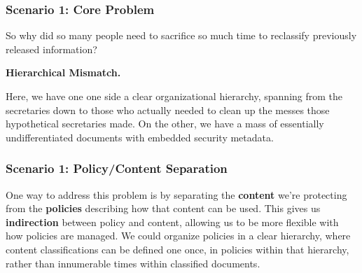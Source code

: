 \documentclass[t,handout, 10pt]{beamer}
\begin{document}
\begin{frame}
\frametitle{Scenario 1: Core Problem}
So why did so many people need to sacrifice so much time to reclassify previously released information?
\newline
\pause
\begin{center}
\textbf{Hierarchical Mismatch.}
\end{center}
\pause
Here, we have one one side a clear organizational hierarchy, spanning from the secretaries down to those who actually needed to clean up the messes those hypothetical secretaries made.  On the other, we have a mass of essentially undifferentiated documents with embedded security metadata.
\end{frame}

\begin{frame}
\frametitle{Scenario 1: Policy/Content Separation}
One way to address this problem is by separating the \textbf{content} we're protecting from the \textbf{policies} describing how that content can be used.
\pause
\newline
\newline
This gives us \textbf{indirection} between policy and content, allowing us to be more flexible with how policies are managed.
\pause
\newline
\newline
We could organize policies in a clear hierarchy, where content classifications can be defined one once, in policies within that hierarchy, rather than innumerable times within classified documents.
\end{frame}
\end{document}
